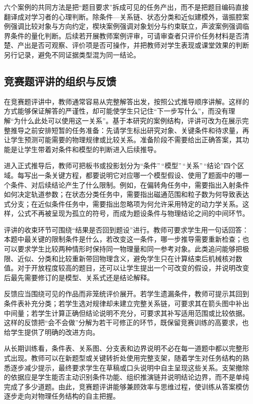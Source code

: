 \documentclass[
  12pt,
  a4paper]{ctexbook}
\begin{document}
六个案例的共同方法是把``题目要求''拆成可见的任务产出，而不是把题目编码直接翻译成对学习者的心理判断。除条件---关系链、状态分类和近似建模外，谐振腔案例强调比较对象与方向约定，楔块案例强调对象划分与约束联立，声波案例强调临界条件的量化判断。后续若开展教师案例评审，可请审查者只评价任务材料是否清楚、产出是否可观察、评价项是否可操作，并把教师对学生表现或课堂效果的判断另行记录，避免不同证据类型混为同一结论。

\subsection{竞赛题评讲的组织与反馈}\label{ux7adeux8d5bux9898ux8bc4ux8bb2ux7684ux7ec4ux7ec7ux4e0eux53cdux9988}

在竞赛题评讲中，教师通常容易从完整解答出发，按照公式推导顺序讲解。这样的方式能够保证解答的严谨性，却可能使学生只记住``下一步写什么''，而没有理解``为什么此处可以使用这一关系''。基于本研究的案例结构，评讲可改为在展示完整推导之前安排短暂的任务准备：先请学生标出研究对象、关键条件和待求量，再让学生预测可能需要的物理规律或比较关系。准备阶段不需要给出正确答案，其功能是让学生带着对条件和模型的判断进入后续推导。

进入正式推导后，教师可把板书或投影划分为``条件''\,``模型''\,``关系''\,``结论''四个区域。每写出一条关键方程，都要说明它对应哪一个模型假设、使用了题面中的哪一个条件、对后续结论产生了什么限制。例如，在偏转角任务中，需要指出入射条件如何决定轨道参数；在状态分类任务中，需要指出磁通范围和粒子数为何导致表达式分支；在近似条件任务中，需要指出忽略项为何允许采用特定的动力学关系。这样，公式不再被呈现为孤立的符号，而成为题设条件与物理结论之间的中间环节。

评讲的收束环节可围绕``结果是否回到题设''进行。教师可要求学生用一句话回答：本题中最关键的限制条件是什么，若改变这一条件，哪一步推导需要重新检查；也可以要求学生比较两种情形时保持同一物理量和同一参考对象。此类追问能够把极限、近似、分类和比较重新带回物理含义，避免学生只在计算结束后机械核对数值。对于开放程度较高的题目，还可以让学生提出一个可改变的假设，并说明改变后最先需要修订的是模型、关系式还是结论解释。

反馈应当围绕可见的作品而非笼统评价展开。若学生遗漏条件，教师可提示其回到条件表补充分类；若学生选对规律却未建立完整关系链，可要求其在箭头图中补出中间量；若学生计算正确但结论说明不充分，可要求其补写适用范围或比较依据。这样的反馈把``会不会做''分解为若干可修正的环节，既保留竞赛训练的高要求，也给学生提供了明确的改进方向。

从长期训练看，条件表、关系图、分支表和边界说明不必在每一道题中都以完整形式出现。教师可以在新题型或关键转折处使用完整支架，随着学生对任务结构的熟悉逐步减少提示，最终要求学生在草稿或口头说明中自主呈现这些关系。支架撤除的依据应是学生能否主动识别条件功能、组织推演链并说明结论边界，而不是单纯完成了多少道题。由此，竞赛题评讲能够兼顾效率与思维过程，使训练从答案模仿逐步走向对物理任务结构的自主把握。
\end{document}
